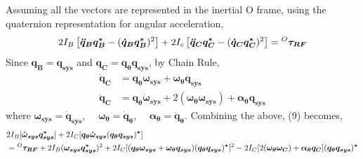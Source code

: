 \subsection{}
Assuming all the vectors are represented in the inertial O frame, using the quaternion representation for angular acceleration,
\begin{equation}
  2I_B \left[\bm{\ddot{q}_B}\bm{q_B^*} - (\bm{\dot{q}_B} \bm{q_B^*})^2\right] + 2I_c \left[\bm{\ddot{q}_C}\bm{q_C^*} - (\bm{\dot{q}_C} \bm{q_C^*})^2\right] = \prescript{O}{}{\bm{\tau_{RF}}}
\end{equation}
Since $\bm{q_B} = \bm{q_{sys}}$ and $\bm{q_C} = \bm{q_{\theta}q_{sys}}$, by Chain Rule,
\begin{align*}
  \bm{\dot{q}_C} &= \bm{q_\theta} \bm{\omega_{sys}} + \bm{\omega_\theta}\bm{q_{sys}} \\
  \bm{\ddot{q}_C} &= \bm{q_\theta} \bm{\dot{\omega}_{sys}} + 2(\bm{\omega_\theta \omega_{sys}}) + \bm{\alpha_\theta}\bm{q_{sys}}
\end{align*}
where $\bm{\omega_{sys}} = \bm{\dot{q}_{sys}}$, $\quad\bm{\omega_{\theta}} = \bm{\dot{q}_{\theta}}$, $\quad \bm{\alpha_{\theta}} = \bm{\ddot{q}_{\theta}}$.
Combining the above, (9) becomes,
\begin{align*}
  &2I_B[\bm{\dot{\omega}_{sys}} \bm{q_{sys}^*}] + 2I_C[\bm{q_\theta}\bm{\dot{\omega}_{sys}} (\bm{q_\theta}\bm{q_{sys}})^{\bm{*}}] \\
  &= \prescript{O}{}{\bm{\tau_{RF}}} + 2I_B(\bm{\omega_{sys}}\bm{q_{sys}^*})^2 + 2I_C[(\bm{q_\theta} \bm{\omega_{sys}} + \bm{\omega_\theta}\bm{q_{sys}})(\bm{q_{\theta}\bm{q_{sys}}})^{\bm{*}}]^2 - 2I_C[2(\bm{\omega_\theta \omega_C}) + \bm{\alpha_\theta} \bm{q_C}](\bm{q_\theta q_{sys}})^{\bm{*}} \\
\end{align*}
